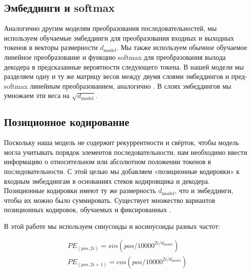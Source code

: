 \documentclass{article}
\newcommand{\dmodel}{d_{\text{model}}}
\begin{document}

\subsection{Эмбеддинги и softmax}
Аналогично другим моделям преобразования последовательностей, мы используем обучаемые эмбеддинги для преобразования входных и выходных токенов в векторы размерности $\dmodel$. Мы также используем обычное обучаемое линейное преобразование и функцию softmax для преобразования выхода декодера в предсказанные вероятности следующего токена. В нашей модели мы разделяем одну и ту же матрицу весов между двумя слоями эмбеддингов и пред-softmax линейным преобразованием, аналогично \citep{press2016using}. В слоях эмбеддингов мы умножаем эти веса на $\sqrt{\dmodel}$.

\subsection{Позиционное кодирование}
Поскольку наша модель не содержит рекуррентности и свёрток, чтобы модель могла учитывать порядок элементов последовательности, нам необходимо ввести информацию о относительном или абсолютном положении токенов в последовательности. С этой целью мы добавляем «позиционные кодировки» к входным эмбеддингам в основаниях стеков кодировщика и декодера. Позиционные кодировки имеют ту же размерность $\dmodel$, что и эмбеддинги, чтобы их можно было суммировать. Существует множество вариантов позиционных кодировок, обучаемых и фиксированных \citep{JonasFaceNet2017}.

В этой работе мы используем синусоиды и косинусоиды разных частот:

\begin{align*}
    PE_{(pos,2i)} = sin(pos / 10000^{2i/\dmodel}) \\
    PE_{(pos,2i+1)} = cos(pos / 10000^{2i/\dmodel})
\end{align*}
\end{document}
